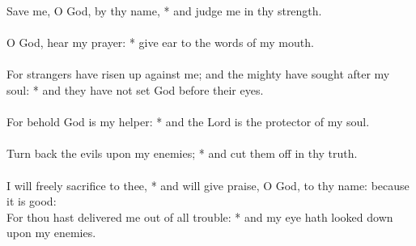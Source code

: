 \begin{Parallel}[v]{\colw}{\colx}
{}
{\vern
{\noindent
Save me, O God, by thy name, * and judge me in thy strength.\\ \\
O God, hear my prayer: * give ear to the words of my mouth.\\ \\
For strangers have risen up against me; and the mighty have sought after my soul: * and they have not set God before their eyes.\\ \\
For behold God is my helper: * and the Lord is the protector of my soul.\\ \\
Turn back the evils upon my enemies; * and cut them off in thy truth.\\ \\
I will freely sacrifice to thee, * and will give praise, O God, to thy name: because it is good:\\ 
For thou hast delivered me out of all trouble: * and my eye hath looked down upon my enemies.}}

\end{Parallel}
